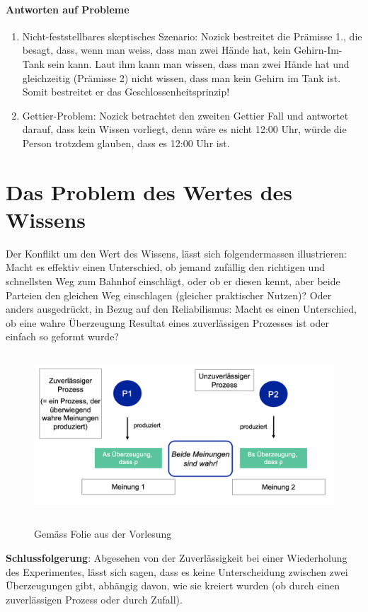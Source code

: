 \documentclass[../main.tex]{subfiles}
\begin{document}
\paragraph{Antworten auf Probleme}
\begin{enumerate}
	\item Nicht-feststellbares skeptisches Szenario: Nozick bestreitet die Prämisse 1., die besagt, dass, wenn man weiss, dass man zwei Hände hat, kein Gehirn-Im-Tank sein kann. Laut ihm kann man wissen, dass man zwei Hände hat und gleichzeitig (Prämisse 2) nicht wissen, dass man kein Gehirn im Tank ist. Somit bestreitet er das Geschlossenheitsprinzip!
	\item Gettier-Problem: Nozick betrachtet den zweiten Gettier Fall und antwortet darauf, dass kein Wissen vorliegt, denn wäre es nicht 12:00 Uhr, würde die Person trotzdem glauben, dass es 12:00 Uhr ist. 
\end{enumerate}

\section{Das Problem des Wertes des Wissens}
Der Konflikt um den Wert des Wissens, lässt sich folgendermassen illustrieren: Macht es effektiv einen Unterschied, ob jemand zufällig den richtigen und schnellsten Weg zum Bahnhof einschlägt, oder ob er diesen kennt, aber beide Parteien den gleichen Weg einschlagen (gleicher praktischer Nutzen)? Oder anders ausgedrückt, in Bezug auf den Reliabilismus: Macht es einen Unterschied, ob eine wahre Überzeugung Resultat eines zuverlässigen Prozesses ist oder einfach so geformt wurde?

\begin{figure}[!htb]
\centering
{\centering\includegraphics[height=6cm]{images/wahre_ueberzeugungen_und_zufaellige_ueberzeugungen.png}\endcenter}
\caption{Gemäss Folie aus der Vorlesung}
\end{figure}



\textbf{Schlussfolgerung}: Abgesehen von der Zuverlässigkeit bei einer Wiederholung des Experimentes, lässt sich sagen, dass es keine Unterscheidung zwischen zwei Überzeugungen gibt, abhängig davon, wie sie kreiert wurden (ob durch einen zuverlässigen Prozess oder durch Zufall).
\end{document}
